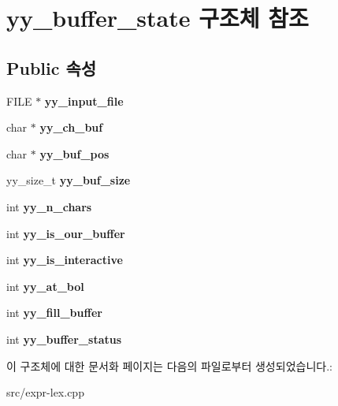 \hypertarget{structyy__buffer__state}{}\section{yy\+\_\+buffer\+\_\+state 구조체 참조}
\label{structyy__buffer__state}
\subsection*{Public 속성}
\begin{DoxyCompactItemize}
\item 
\mbox{\label{structyy__buffer__state_a4843d1422e3276b636d475a3095bd948}} 
F\+I\+LE $\ast$ {\bfseries yy\+\_\+input\+\_\+file}
\item 
\mbox{\label{structyy__buffer__state_ad7b8df8d8a4688e57b0b8d3ca75adc85}} 
char $\ast$ {\bfseries yy\+\_\+ch\+\_\+buf}
\item 
\mbox{\label{structyy__buffer__state_a58aa927f098b99d99e75da80f9b681ef}} 
char $\ast$ {\bfseries yy\+\_\+buf\+\_\+pos}
\item 
\mbox{\label{structyy__buffer__state_a48302f5f3477a9c78bbddf56d356ef54}} 
yy\+\_\+size\+\_\+t {\bfseries yy\+\_\+buf\+\_\+size}
\item 
\mbox{\label{structyy__buffer__state_a06406208824817acfec2183b79080945}} 
int {\bfseries yy\+\_\+n\+\_\+chars}
\item 
\mbox{\label{structyy__buffer__state_a80ce2431c70dc4f89ced487f18449465}} 
int {\bfseries yy\+\_\+is\+\_\+our\+\_\+buffer}
\item 
\mbox{\label{structyy__buffer__state_abf5c70eea75581b58c0ee7bd31b14490}} 
int {\bfseries yy\+\_\+is\+\_\+interactive}
\item 
\mbox{\label{structyy__buffer__state_a9d60c60af6e1a6f69de16871fd64f85f}} 
int {\bfseries yy\+\_\+at\+\_\+bol}
\item 
\mbox{\label{structyy__buffer__state_a63d2afbb1d79a3fc63df9e12626f827d}} 
int {\bfseries yy\+\_\+fill\+\_\+buffer}
\item 
\mbox{\label{structyy__buffer__state_a70fd925d37a2f0454fbd0def675d106c}} 
int {\bfseries yy\+\_\+buffer\+\_\+status}
\end{DoxyCompactItemize}


이 구조체에 대한 문서화 페이지는 다음의 파일로부터 생성되었습니다.\+:\begin{DoxyCompactItemize}
\item 
src/expr-\/lex.\+cpp\end{DoxyCompactItemize}
